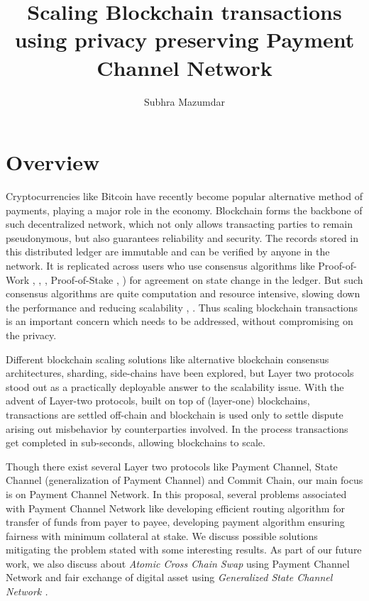 \documentclass[10pt]{article}
\begin{document}
\title{Scaling Blockchain transactions using privacy preserving Payment Channel Network}
\author{Subhra Mazumdar}
\date{}
\maketitle
\section{Overview}
Cryptocurrencies like Bitcoin \cite{nakamoto2008bitcoin} have recently become popular alternative method of payments, playing a major role in the economy. Blockchain forms the backbone of such decentralized network, which not only allows transacting parties to remain pseudonymous, but also guarantees reliability and security. The records stored in this distributed ledger are immutable and can be verified by anyone in the network. It is replicated across users who use consensus algorithms like Proof-of-Work \cite{nakamoto2008bitcoin}, \cite{o2014bitcoin}, \cite{bano2017consensus}, Proof-of-Stake \cite{king2012ppcoin}, \cite{li2017securing}) for agreement on state change in the ledger. But such consensus algorithms are quite computation and resource intensive, slowing down the performance and reducing scalability \cite{croman2016scaling}, \cite{poon2016bitcoin}. Thus scaling blockchain transactions is an important concern which needs to be addressed, without compromising on the privacy. 

Different blockchain scaling solutions like
alternative blockchain consensus architectures, sharding, side-chains have been explored, but Layer two protocols stood out as a practically deployable answer to the scalability issue. 
With the advent of Layer-two protocols, built on top of
(layer-one) blockchains, transactions are settled off-chain and blockchain is used only to settle dispute arising out misbehavior by counterparties involved. In the process transactions get completed in sub-seconds, allowing blockchains to scale.

Though there exist several Layer two protocols like Payment Channel, State Channel (generalization of Payment Channel) and Commit Chain, our main focus is on Payment Channel Network. In this proposal, several problems associated with Payment Channel Network like developing efficient routing algorithm for transfer of funds from payer to payee, developing payment algorithm ensuring fairness with minimum collateral at stake. We discuss possible solutions mitigating the problem stated with some interesting results. As part of our future work, we also discuss about \emph{Atomic Cross Chain Swap} \cite{herlihy2018atomic} using Payment Channel Network and fair exchange of digital asset using \emph{Generalized State Channel Network \cite{dziembowski2018general}.}    
\end{document}
